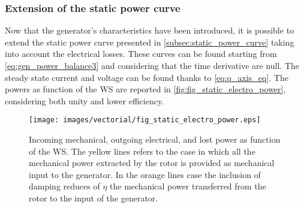  \subsubsection{Extension of the static power curve}\label{subsec:genertaor_power_curve}
 Now that the generator's characteristics have been introduced, it is possible to extend the static power curve presented in \autoref{subsec:static_power_curve} taking into account the electrical losses. These curves can be found starting from \autoref{eq:gen_power_balance3} and considering that the time derivative are null. The steady state current and voltage can be found thanks to \autoref{eq:q_axis_eq}. The powers as function of the \acrshort{WS} are reported in \autoref{fig:fig_static_electro_power}, considering both unity and lower efficiency.
\begin{figure}[htb]
  \centering
  \texttt{[image: images/vectorial/fig\_static\_electro\_power.eps]}
  \caption{Incoming mechanical, outgoing electrical, and lost power as function of the WS. The yellow lines refers to the case in which all the mechanical power extracted by the rotor is provided as mechanical input to the generator. In the orange lines case the inclusion of damping reduces of $\eta$ the mechanical power transferred from the rotor to the input of the generator. }
  \label{fig:fig_static_electro_power}
\end{figure}

 